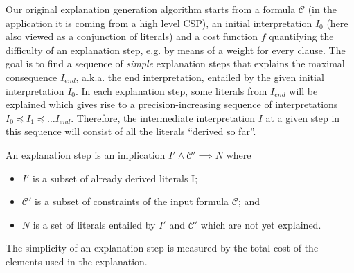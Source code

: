 \documentclass[a4paper,UKenglish,cleveref, autoref, thm-restate, pdfa]{lipics-v2021}
\newcommand\m[1]{\mathcal{#1}}
\renewcommand\comment[1]{}
\newcommand{\bart}[1]{{\comment{\color{OliveGreen}Bart: #1}}}
\newcommand\Iend{\ensuremath{I_\mathit{end} }\xspace}
\newcommand\formula{\ensuremath{\m{F} }\xspace}
\newcommand\formulac{\ensuremath{\m{C} }\xspace}
\begin{document}
	Our original explanation generation algorithm \cite{ecai/BogaertsGCG20} starts from a formula $\formulac$ (in the application it is coming from a high level CSP), an initial interpretation $I_0$ (here also viewed as a conjunction of literals) and a cost function $f$ quantifying the difficulty of an explanation step, e.g. by means of a weight for every clause. 
	The goal is to find a sequence of \textit{simple} explanation steps that explains the maximal consequence \Iend, a.k.a. the end interpretation, entailed by the given initial interpretation $I_0$. In each explanation step, some literals from \Iend will be explained which gives rise to a precision-increasing sequence of interpretations $I_0 \preceq I_1 \preceq \dots I_{end}$. Therefore, the intermediate interpretation $I$ at a given step in this sequence will consist of all the literals ``derived so far''. 
	
	An explanation step is an implication $I' \wedge \formulac' \implies N$ where \begin{itemize}
		\item $I'$ is a subset of already derived literals I;
		\item $\formulac'$ is a subset of constraints of the input formula $\formulac$; and
		\item $N$ is a set of literals entailed by $I'$ and $\formulac'$ which are not yet explained.
	\end{itemize} 
	
	The simplicity of an explanation step is measured by the total cost of the elements used in the explanation.
	
	
	
\end{document}
